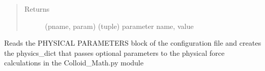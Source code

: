 \documentclass[letterpaper,10pt,english]{sphinxmanual}
\begin{document}
\begin{fulllineitems}
\begin{fulllineitems}
\begin{quote}
\begin{description}
\end{description}\end{quote}
\begin{quote}\begin{description}
\item[{Returns}] \leavevmode
(pname, param) (tuple) parameter name, value

\end{description}\end{quote}

\end{fulllineitems}


\begin{fulllineitems}
\label{\detokenize{index:lb_colloids.Colloids.Colloid_IO.Config.physical_parameters}}
Reads the PHYSICAL PARAMETERS block of the configuration file and creates
the physics\_dict that passes optional parameters to the physical force calculations
in the Colloid\_Math.py module

\end{fulllineitems}


\end{fulllineitems}

\end{document}
